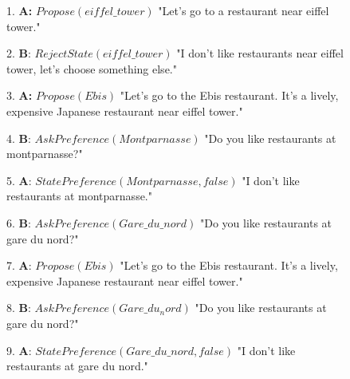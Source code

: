 	
	\begin{figure}[!t]
	\begin{minipage}{\textwidth}
			{\ttfamily
				\begin{addmargin}[1em]{2em}%
					\vspace{0.5 em}
					1. \textbf{A:} $Propose(eiffel\_tower)$ "Let's go to a restaurant \hspace*{3mm} near eiffel tower."
					
					
					2. \hspace*{3mm}\textbf{B}: $RejectState(eiffel\_tower)$ "I don't like \hspace*{4mm} restaurants near eiffel tower, let's choose \hspace*{4mm} something else."
					
					
					3. \textbf{A:} $Propose(Ebis)$ "Let's go to the Ebis restaurant. \hspace*{3mm} It's  a lively, expensive Japanese restaurant near \hspace*{3mm} eiffel tower."
					
					
					4. \hspace*{3mm}\textbf{B}: $AskPreference(Montparnasse)$ "Do you like \hspace*{4mm} restaurants at montparnasse?"
					
					
					5. \textbf{A}: $StatePreference(Montparnasse,false)$ "I don't like \hspace*{3mm} restaurants at montparnasse."
					
					
					6. \hspace*{3mm}\textbf{B}: $AskPreference(Gare\_du\_nord)$ "Do you like \hspace*{4mm} restaurants at gare du nord?"
					
					
					7. \textbf{A}: $Propose(Ebis)$ "Let's go to the Ebis  restaurant. \hspace*{3mm} It's a lively, expensive Japanese   restaurant near \hspace*{3mm} eiffel tower."
					
					
					8. \hspace*{3mm}\textbf{B}: $AskPreference(Gare\_du_nord)$ "Do you like \hspace*{4mm} restaurants at gare du nord?"
					
					
					9. \textbf{A}: $StatePreference(Gare\_du\_nord,false)$ "I don't like \hspace*{3mm} restaurants at gare du nord."
					

\end{addmargin}}
\end{minipage}
\end{figure}
